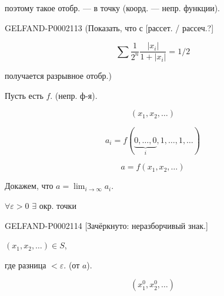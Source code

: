 поэтому такое отобр. --- в точку (коорд. --- непр. функции).



\begin{GelfandAdjacentEvidence}{GELFAND-P000211}{3}
(Показать, что с [рассет. / рассеч.?]
\end{GelfandAdjacentEvidence}

\begin{equation*}\sum\frac{1}{2^n}\frac{|x_i|}{1+|x_i|}=1/2\end{equation*}



получается разрывное отобр.)



Пусть есть $f$. (непр. ф-я).



\begin{equation*}(x_1,x_2,\ldots)\end{equation*}



\begin{equation*}a_i=f(\underbrace{0,\ldots,0}_{i},1,\ldots,1,\ldots)\end{equation*}



\begin{equation*}a=f(x_1,x_2,\ldots)\end{equation*}



Докажем, что $a=\lim_{i\to\infty}a_i$.



$\forall\varepsilon>0$ $\exists$ окр. точки



\begin{GelfandAdjacentEvidence}{GELFAND-P000211}{4}
[Зачёркнуто: неразборчивый знак.]
\end{GelfandAdjacentEvidence}

$(x_1,x_2,\ldots)\in S$,



где разница $<\varepsilon$. (от $a$).



\begin{equation*}(x_1^0,x_2^0,\ldots)\end{equation*}



